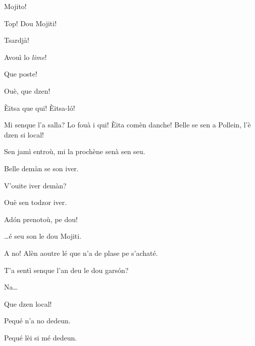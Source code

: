 \begin{drama}
\Louisspeaks Mojito!

\Pierrespeaks Top!  Dou Mojiti!

\Louisspeaks Tsardjà!

\Pierrespeaks Avouì lo \textit{lime}!


\Louisspeaks{} Que poste!

\Pierrespeaks{} Ouè, que dzen!


\Louisspeaks{} \`Eitsa que qui! \`Eitsa-l\'o!


\Pierrespeaks Mi senque l'a salla? Lo fouà i qui! \`Eita comèn danche! Belle se sen a Pollein, l'è dzen si local!

\Louisspeaks Sen jamì entroù, mi la prochène senà sen seu.

\Pierrespeaks Belle demàn se son iver.

\Louisspeaks{} V'ouite iver demàn?

\Bertaspeaks Ouè sen todzor iver.

\Pierrespeaks Ad\'on prenotoù, pe dou!


\Helenespeaks \ldots é seu son le dou Mojiti.


\Pierrespeaks A no! Alèn aoutre lé que n'a de plase pe s'achaté.


\Bertaspeaks{} T'a sentì senque l'an deu le dou gars\'on?

\Helenespeaks Na\ldots

\Bertaspeaks{} \og Que dzen local\fg!

\Helenespeaks{} Pequé n'a no dedeun.

\Bertaspeaks{} Pequé lèi si mé dedeun.



\end{drama}
